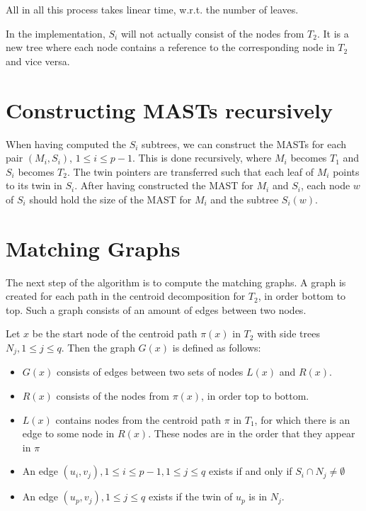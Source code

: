 All in all this process takes linear time, w.r.t. the number of leaves.

In the implementation, $S_i$ will not actually consist of the nodes from $T_2$. It is a new tree where each node contains a reference to the corresponding node in $T_2$ and vice versa.

\section{Constructing MASTs recursively}
When having computed the $S_i$ subtrees, we can construct the MASTs for each pair $(M_i, S_i)$, $1 \le i \le p-1$. This is done recursively, where $M_i$ becomes $T_1$ and $S_i$ becomes $T_2$. The twin pointers are transferred such that each leaf of $M_i$ points to its twin in $S_i$. %
After having constructed the MAST for $M_i$ and $S_i$, each node $w$ of $S_i$ should hold the size of the MAST for $M_i$ and the subtree $S_i(w)$. 

\section{Matching Graphs}
The next step of the algorithm is to compute the matching graphs. A graph is created for each path in the centroid decomposition for $T_2$, in order bottom to top. Such a graph consists of an amount of edges between two nodes.

Let $x$ be the start node of the centroid path $\pi(x)$ in $T_2$ with side trees $N_j, 1 \le j \le q$. Then the graph $G(x)$ is defined as follows:

\begin{itemize}
	\item $G(x)$ consists of edges between two sets of nodes $L(x)$ and $R(x)$.
	\item $R(x)$ consists of the nodes from $\pi(x)$, in order top to bottom.
	\item $L(x)$ contains nodes from the centroid path $\pi$ in $T_1$, for which there is an edge to some node in $R(x)$. These nodes are in the order that they appear in $\pi$
	\item An edge $(u_i, v_j), 1 \le i \le p-1, 1 \le j \le q$ exists if and only if $S_i \cap N_j \ne \emptyset$
	\item An edge $(u_p, v_j), 1 \le j \le q$ exists if the twin of $u_p$ is in $N_j$.
\end{itemize}

